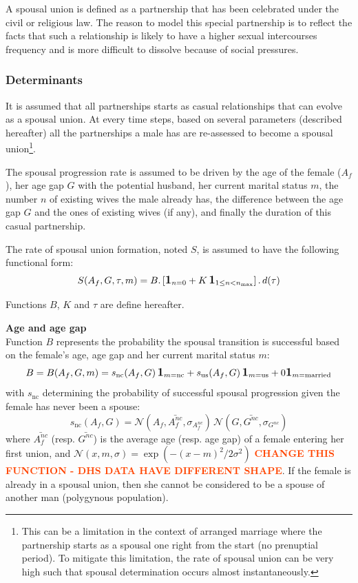 \documentclass[11pt, onecolumn]{article}
\newcommand{\one}[1]{\textbf{\large{1}}_{#1}}
\newcommand{\warning}[1]{\textbf{\textcolor{OrangeRed}{#1}}}
\begin{document}
A spousal union is defined as a partnership that has been celebrated under the civil or religious law. The reason to model this special partnership is to reflect the facts that such a relationship is likely to have a higher sexual intercourses frequency and is more difficult to dissolve because of social pressures.

\subsubsection{Determinants}

It is assumed that all partnerships starts as casual relationships that can evolve as a spousal union. At every time steps, based on several parameters (described hereafter) all the partnerships a male has are re-assessed to become a spousal union\footnote{This can be a limitation in the context of arranged marriage where the partnership starts as a spousal one right from the start (no prenuptial period). To mitigate this limitation, the rate of spousal union can be very high such that spousal determination occurs almost instantaneously.}.

The spousal progression rate is assumed to be driven by the age of the female ($A_f$), her age gap $G$ with the potential husband, her current marital status $m$, the number $n$ of existing wives the male already has, the difference between the age gap $G$ and the ones of existing wives (if any), and finally the duration of this casual partnership.

The rate of spousal union formation, noted $S$, is assumed to have the following functional form:
\begin{equation}
\label{eqSpouse}
S(A_f,G,\tau,m) = B . \left[\one{n=0} +  K\,\one{1\leq n <n_{\mathrm{max}}} \right] .\, d(\tau)
\end{equation}

Functions $B$, $K$ and $\tau$ are define hereafter.

\textbf{Age and age gap}\\
Function $B$ represents the probability the spousal transition is successful based on the female's age, age gap and her current marital status $m$:
$$B = B(A_f,G,m)= s_{\mathrm{nc}}(A_f,G)\,\one{m=\mathrm{nc}} + s_{\mathrm{us}}(A_f,G)\,\one{m=\mathrm{us}} + 0\one{m=\text{married}}  $$
with $ s_{\mathrm{nc}}$ determining the probability of successful spousal progression given the female has never been a spouse:
$$ s_{\mathrm{nc}}(A_f,G) = \mathcal{N}(A_f,\bar{A_f^{nc}},\sigma_{A_f^{nc}})\, \mathcal{N}(G,\bar{G^{nc}},\sigma_{G^{nc}}) $$
where $\bar{A_f^{nc}}$ (resp. $\bar{G^{nc}}$) is the average age (resp. age gap) of a female entering her first union,  and $\mathcal{N}(x,m,\sigma)=\exp(-(x-m)^2/2\sigma^2)$ \warning{CHANGE THIS FUNCTION - DHS DATA HAVE DIFFERENT SHAPE}. If the female is already in a spousal union, then she cannot be considered to be a spouse of another man (polygynous population).
\end{document}
